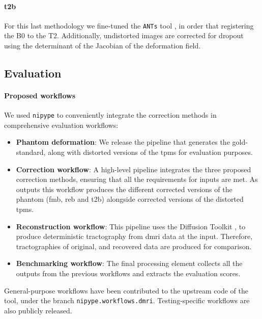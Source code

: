 \paragraph*{\Gls*{t2b}} For this last methodology
we fine-tuned the \texttt{ANTs} tool \cite{avants_ants:_2013},
in order that registering the B0 to the T2. Additionally,
undistorted images are corrected for dropout using the determinant
of the Jacobian of the deformation field.

\subsection{Evaluation}

\paragraph*{Proposed workflows}
We used \texttt{nipype} \cite{gorgolewski_nipype:_2011}
to conveniently integrate the correction methods in
comprehensive evaluation workflows:

\begin{itemize}
\item \textbf{Phantom deformation}: We release the pipeline
that generates the gold-standard, along with
distorted versions of the \glspl*{tpm} for
evaluation purposes.
\item \textbf{Correction workflow}: A high-level pipeline
integrates the three proposed correction methods,
ensuring that all the requirements for inputs are
met. As outputs this workflow produces the different
corrected versions of the phantom (\gls*{fmb}, \gls*{reb}
and \gls*{t2b}) alongside corrected versions of the
distorted \glspl*{tpm}.
\item \textbf{Reconstruction workflow}: This pipeline uses
the Diffusion Toolkit \cite{wang_diffusion_2007}, 
to produce deterministic tractography
from \gls*{dmri} data at the input. Therefore,
tractographies of original, and recovered data
are produced for comparison.
\item \textbf{Benchmarking workflow}: The final processing
element collects all the outputs from the previous
workflows and extracts the evaluation scores.
\end{itemize}
General-purpose 
workflows have been contributed to the upstream code
of the tool, under the branch \texttt{nipype.workflows.dmri}.
Testing-specific workflows are also publicly released.


